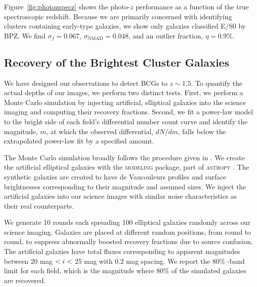 \documentclass[apj, revtex4-1]{emulateapj}
\begin{document}
Figure~\ref{fig:photozspecz} shows the photo-$z$ performance as a function of the true spectroscopic redshift. Because we are primarily concerned with identifying clusters containing early-type galaxies, we show only galaxies classified E/S0 by BPZ. We find $\sigma_f = 0.067$, $\sigma_\mathrm{NMAD} = 0.048$, and an outlier fraction, $\eta = 0.9\%$.

\subsection{Recovery of the Brightest Cluster Galaxies}
We have designed our observations to detect BCGs to $z\sim1.5$. To quantify the actual depths of our images, we perform two distinct tests. First, we perform a Monte Carlo simulation by injecting artificial, elliptical galaxies into the science imaging and computing their recovery fractions. Second, we fit a power-law model to the bright side of each field's differential number count curve and identify the magnitude, $m$, at which  the observed differential, $dN/dm$, falls below the extrapolated power-law fit by a specified amount.

The Monte Carlo simulation broadly follows the procedure given in \cite{Menanteau2010a}. We create the artificial elliptical galaxies with the \textsc{modeling} package, part of \textsc{astropy} \citep{TheAstropyCollaboration2013}. The synthetic galaxies are created to have de Vaucouleurs \citep{DeVaucouleurs1948} profiles and surface brightnesses corresponding to their magnitude and assumed sizes. We inject the artificial galaxies into our science images with similar noise characteristics as their real counterparts.

We generate 10 rounds each spreading 100 elliptical galaxies randomly across our science imaging. Galaxies are placed at different random positions, from round to round, to suppress abnormally boosted recovery fractions due to source confusion. The artificial galaxies have total fluxes corresponding to apparent magnitudes between 20 mag $< \hbox{$i$} <$ 25 mag with $0.2$ mag spacing. We report the 80\% \sdssi-band limit for each field, which is the magnitude where 80\% of the simulated galaxies are recovered.
\end{document}
